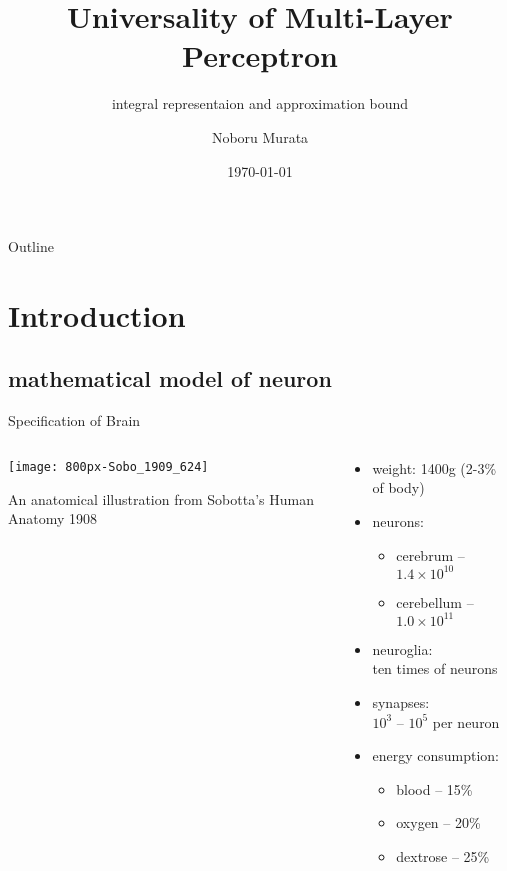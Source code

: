 \documentclass[fleqn,aspectratio=1610]{beamer}
\author{Noboru Murata}
\date{\today}
\title{Universality of Multi-Layer Perceptron}
\subtitle{integral representaion and approximation bound}
\institute{\url{https://noboru-murata.github.io/}}
\begin{document}
\maketitle
\begin{frame}{Outline}
\tableofcontents
\end{frame}


\section{Introduction}
\label{sec:org25f52e9}
\subsection{mathematical model of neuron}
\label{sec:orgcd3e974}
\begin{frame}[label={sec:orge5d91fa}]{Specification of Brain}
\begin{columns}
\begin{column}{0.57\columnwidth}
\begin{center}
\texttt{[image: 800px-Sobo\_1909\_624]}
\\[10pt]
\end{center}
\scriptsize
An anatomical illustration from Sobotta's Human Anatomy 1908
\end{column}
\begin{column}{0.43\columnwidth}
\begin{itemize}
\item weight: 1400g (2-3\% of body)
\item neurons:
\begin{itemize}
\item cerebrum -- \(1.4 \times 10^{10}\)
\item cerebellum -- \(1.0 \times 10^{11}\)
\end{itemize}
\item neuroglia: \\[0pt]
ten times of neurons
\item synapses: \\[0pt]
\(10^{3}\) -- \(10^{5}\) per neuron
\item energy consumption: 
\begin{itemize}
\item blood -- 15\%
\item oxygen -- 20\%
\item dextrose -- 25\%
\end{itemize}
\end{itemize}
\end{column}
\end{columns}
\end{frame}
\end{document}
